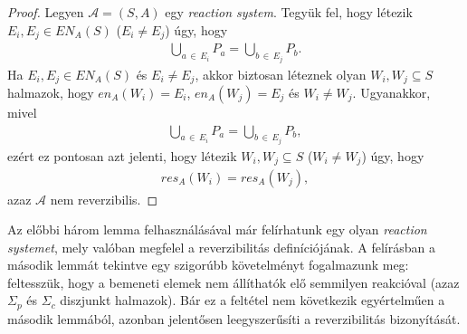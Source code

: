\documentclass[12pt]{article}
\theoremstyle{definition}
\theoremstyle{remark}
\theoremstyle{plain}
\theoremstyle{remark}
\theoremstyle{plain}
\newcommand{\en}{\textit{en}}
\newcommand{\res}{\textit{res}}
\begin{document}
    \begin{proof}
        Legyen $\mathscr{A} = (S, A)$ egy \textit{reaction system}. Tegyük fel, hogy létezik $E_{i}, E_{j} \in \textit{EN}_{A}(S)$ ($E_{i} \neq E_{j}$) úgy, hogy
        \begin{align*}
            \bigcup\limits_{a \,\in\, E_{i}} P_{a} = \bigcup\limits_{b \,\in\, E_{j}} P_{b}.
        \end{align*}
        Ha $E_{i}, E_{j} \in \textit{EN}_{A}(S)$ és $E_{i} \neq E_{j}$, akkor biztosan léteznek olyan $W_{i}, W_{j} \subseteq S$ halmazok, hogy $\en_{A}(W_{i}) = E_{i}$, $\en_{A}(W_{j}) = E_{j}$ és $W_{i} \neq W_{j}$. Ugyanakkor, mivel
        \begin{align*}
            \bigcup\limits_{a \,\in\, E_{i}} P_{a} = \bigcup\limits_{b \,\in\, E_{j}} P_{b},
        \end{align*}
        ezért ez pontosan azt jelenti, hogy létezik $W_{i}, W_{j} \subseteq S$ ($W_{i} \neq W_{j}$) úgy, hogy
        \begin{align*}
            \res_{A}(W_{i}) = \res_{A}(W_{j}),
        \end{align*}
        azaz $\mathscr{A}$ nem reverzibilis.
    \end{proof}

    Az előbbi három lemma felhasználásával már felírhatunk egy olyan \textit{reaction systemet}, mely valóban megfelel a reverzibilitás definíciójának. A felírásban a második lemmát tekintve egy szigorúbb követelményt fogalmazunk meg: feltesszük, hogy a bemeneti elemek nem állíthatók elő semmilyen reakcióval (azaz $\Sigma_{p}$ és $\Sigma_{c}$ diszjunkt halmazok). Bár ez a feltétel nem következik egyértelműen a második lemmából, azonban jelentősen leegyszerűsíti a reverzibilitás bizonyítását.
\end{document}
